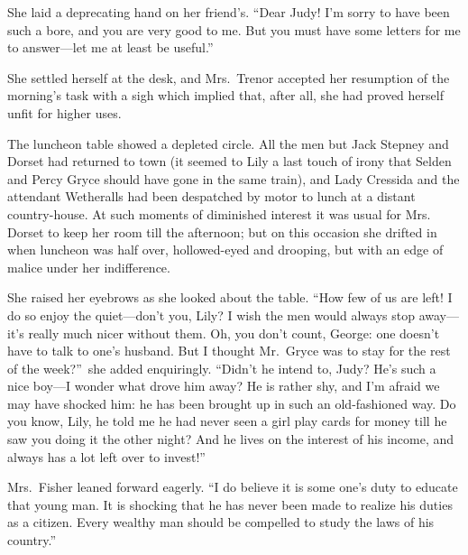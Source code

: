 \documentclass[12pt,a4paper]{book}
\begin{document}
She laid a deprecating hand on her friend's. ``Dear Judy! I'm
sorry to have been such a bore, and you are very good to me. But
you must have some letters for me to answer---let me at least be
useful.''





She settled herself at the desk, and Mrs.\ Trenor accepted her
resumption of the morning's task with a sigh which implied that,
after all, she had proved herself unfit for higher uses.





The luncheon table showed a depleted circle. All the men but Jack
Stepney and Dorset had returned to town (it seemed to Lily a last
touch of irony that Selden and Percy Gryce should have gone in
the same train), and Lady Cressida and the attendant Wetheralls
had been despatched by motor to lunch at a distant country-house. 
At such moments of diminished interest it was usual for Mrs.
Dorset to keep her room till the afternoon; but on this occasion
she drifted in when luncheon was half over, hollowed-eyed and
drooping, but with an edge of malice under her indifference.





She raised her eyebrows as she looked about the table. ``How few
of us are left! I do so enjoy the quiet---don't you, Lily? I wish
the men would always stop away---it's really much nicer without
them. Oh, you don't count, George: one doesn't have to talk to
one's husband. But I thought Mr.\ Gryce was to stay for the rest
of the week?''\ she added enquiringly. ``Didn't he intend to, Judy? 
He's such a nice boy---I wonder what drove him away? He is rather
shy, and I'm afraid we may have shocked him: he has been brought
up in such an old-fashioned way. Do you know, Lily, he told me he
had never seen a girl play cards for money till he saw you doing
it the other night? And he lives on the interest of his income,
and always has a lot left over to invest!''





Mrs.\ Fisher leaned forward eagerly. ``I do believe it is some
one's duty to educate that young man. It is shocking that he has
never been made to realize his duties as a citizen. Every wealthy
man should be compelled to study the laws of his country.''
\end{document}
